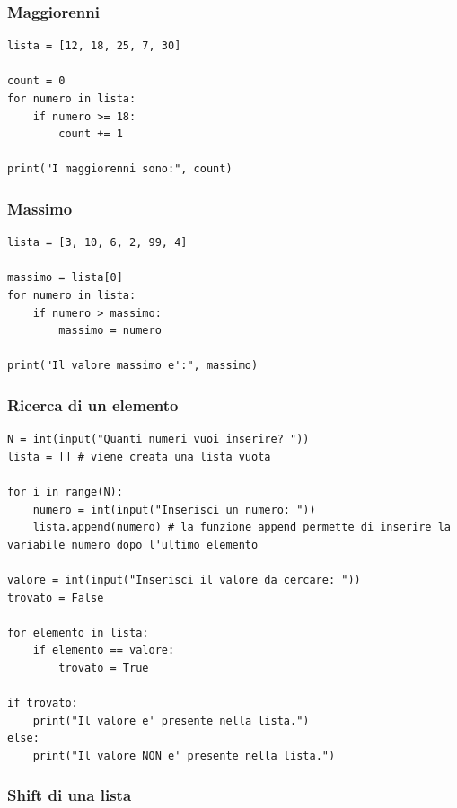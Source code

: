 \documentclass[a4paper,12pt]{article}
\begin{document}
\subsubsection{Maggiorenni}

\begin{lstlisting}
lista = [12, 18, 25, 7, 30]
	
count = 0
for numero in lista:
	if numero >= 18:
		count += 1
	
print("I maggiorenni sono:", count)
\end{lstlisting}


\newpage
\subsubsection{Massimo}

\begin{lstlisting}
lista = [3, 10, 6, 2, 99, 4]

massimo = lista[0]
for numero in lista:
	if numero > massimo:
		massimo = numero

print("Il valore massimo e':", massimo)
	\end{lstlisting}
	
	
	\newpage
\subsubsection{Ricerca di un elemento}

	\begin{lstlisting}
N = int(input("Quanti numeri vuoi inserire? "))
lista = [] # viene creata una lista vuota
		
for i in range(N):
	numero = int(input("Inserisci un numero: "))
	lista.append(numero) # la funzione append permette di inserire la variabile numero dopo l'ultimo elemento
		
valore = int(input("Inserisci il valore da cercare: "))
trovato = False

for elemento in lista:
	if elemento == valore:
		trovato = True
		
if trovato:
	print("Il valore e' presente nella lista.")
else:
	print("Il valore NON e' presente nella lista.")
	\end{lstlisting}
	
		
\newpage
	
	
\subsubsection{Shift di una lista}
\end{document}
